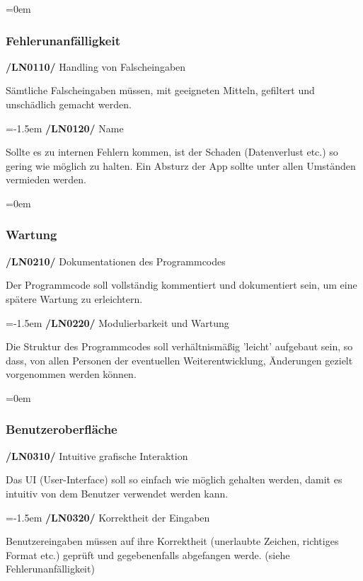 \documentclass[11pt,a4paper]{report}
\begin{document}
\leftskip=0em
\subsubsection{Fehlerunanfälligkeit}

\textbf{/LN0110/} Handling von Falscheingaben
\par
\begingroup
\leftskip=1cm
\noindent Sämtliche Falscheingaben müssen, mit geeigneten Mitteln, gefiltert und unschädlich gemacht werden.\\
\par
\endgroup

\leftskip=-1.5em
\textbf{/LN0120/} Name
\par
\begingroup
\leftskip=1cm
\noindent Sollte es zu internen Fehlern kommen, ist der Schaden (Datenverlust etc.) so gering wie möglich zu halten. Ein Absturz der App sollte unter allen Umständen vermieden werden.\\
\par
\endgroup

\leftskip=0em
\subsubsection{Wartung}

\textbf{/LN0210/} Dokumentationen des Programmcodes
\par
\begingroup
\leftskip=1cm
\noindent Der Programmcode soll vollständig kommentiert und dokumentiert sein, um eine spätere Wartung zu erleichtern.\\
\par
\endgroup

\leftskip=-1.5em
\textbf{/LN0220/} Modulierbarkeit und Wartung
\par
\begingroup
\leftskip=1cm
\noindent Die Struktur des Programmcodes soll verhältnismäßig 'leicht' aufgebaut sein, so dass, von allen Personen der eventuellen Weiterentwicklung, Änderungen gezielt vorgenommen werden können.\\
\par
\endgroup

\leftskip=0em
\subsubsection{Benutzeroberfläche}

\textbf{/LN0310/} Intuitive grafische Interaktion
\par
\begingroup
\leftskip=1cm
\noindent Das UI (User-Interface) soll so einfach wie möglich gehalten werden, damit es intuitiv von dem Benutzer verwendet werden kann.\\
\par
\endgroup
\newpage
\leftskip=-1.5em
\textbf{/LN0320/} Korrektheit der Eingaben
\par
\begingroup
\leftskip=1cm
\noindent Benutzereingaben müssen auf ihre Korrektheit (unerlaubte Zeichen, richtiges Format etc.) geprüft und gegebenenfalls abgefangen werde. (siehe Fehlerunanfälligkeit)\\
\par
\endgroup
\end{document}
